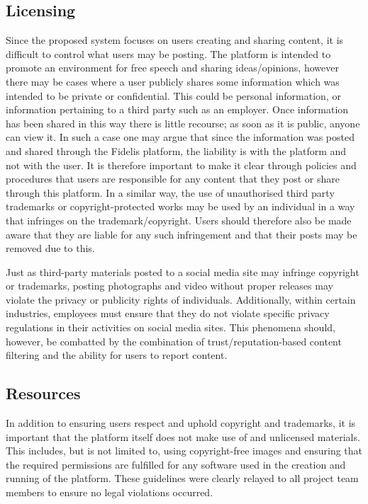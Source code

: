 \subsection{Licensing}
Since the proposed system focuses on users creating and sharing content, it is difficult to control what users may be posting. The platform is intended to promote an environment for free speech and sharing ideas/opinions, however there may be cases where a user publicly shares some information which was intended to be private or confidential. This could be personal information, or information pertaining to a third party such as an employer. Once information has been shared in this way there is little recourse; as soon as it is public, anyone can view it. In such a case one may argue that since the information was posted and shared through the Fidelis platform, the liability is with the platform and not with the user. It is therefore important to make it clear through policies and procedures that users are responsible for any content that they post or share through this platform. In a similar way, the use of unauthorised third party trademarks or copyright-protected works may be used by an individual in a way that infringes on the trademark/copyright. Users should therefore also be made aware that they are liable for any such infringement and that their posts may be removed due to this.

Just as third-party materials posted to a social media site may infringe copyright or trademarks, posting photographs and video without proper releases may violate the privacy or publicity rights of individuals. Additionally, within certain industries, employees must ensure that they do not violate specific privacy regulations in their activities on social media sites. This phenomena should, however, be combatted by the combination of trust/reputation-based content filtering and the ability for users to report content.

\subsection{Resources}
In addition to ensuring users respect and uphold copyright and trademarks, it is important that the platform itself does not make use of and unlicensed materials. This includes, but is not limited to, using copyright-free images and ensuring that the required permissions are fulfilled for any software used in the creation and running of the platform. These guidelines were clearly relayed to all project team members to ensure no legal violations occurred.

